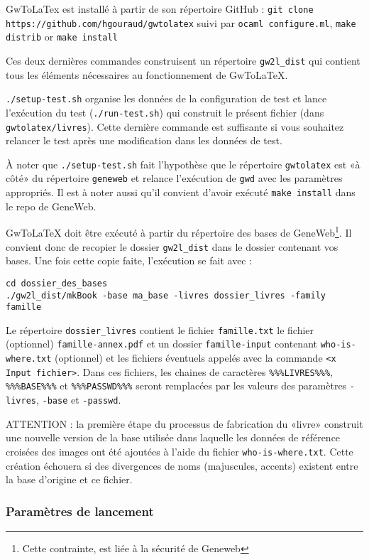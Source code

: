 GwToLaTex est installé à partir de son répertoire GitHub :
\verb|git clone https://github.com/hgouraud/gwtolatex|
suivi par
\verb|ocaml configure.ml|, \verb|make distrib| or \verb|make install|

Ces deux dernières commandes construisent un répertoire \verb|gw2l_dist| qui
contient tous les éléments nécessaires au fonctionnement de GwToLaTeX.

\verb|./setup-test.sh| organise les données de la configuration de test et
lance l'exécution du test (\verb|./run-test.sh|) qui construit le présent
fichier (dans \verb|gwtolatex/livres|). Cette dernière commande est
suffisante si vous souhaitez relancer le test après une modification
dans les données de test.

À noter que \verb|./setup-test.sh| fait l'hypothèse que le répertoire
\verb|gwtolatex| est «à côté» du répertoire \verb|geneweb| et relance
l'exécution de \verb|gwd| avec les paramètres appropriés. Il est à noter
aussi qu'il convient d'avoir exécuté \verb|make install| dans le repo de GeneWeb.

GwToLaTeX doit être exécuté à partir du répertoire des bases de
GeneWeb\footnote{Cette contrainte, est liée à la sécurité de Geneweb}.
Il convient donc de recopier le dossier \verb|gw2l_dist| dans le
dossier contenant vos bases. Une fois cette copie faite, l'exécution se
fait avec :
\begin{verbatim}
cd dossier_des_bases
./gw2l_dist/mkBook -base ma_base -livres dossier_livres -family famille
\end{verbatim}

Le répertoire \verb|dossier_livres| contient le fichier \verb|famille.txt|
le fichier (optionnel) \verb|famille-annex.pdf| et un dossier
\verb|famille-input| contenant \verb|who-is-where.txt| (optionnel)
et les fichiers éventuels appelés avec la commande \verb|<x Input fichier>|.
Dans ces fichiers, les chaines de caractères \verb|%%%LIVRES%%%|,
\verb|%%%BASE%%%| et \verb|%%%PASSWD%%%| seront remplacées par les valeurs
des paramètres \verb|-livres|, \verb|-base| et \verb|-passwd|.

ATTENTION : la première étape du processus de fabrication du «livre» construit une 
nouvelle version de la base utilisée dans laquelle les données de référence
croisées des images ont été ajoutées à l'aide du fichier \verb|who-is-where.txt|.
Cette création échouera si des divergences de noms (majuscules, accents) existent
entre la base d'origine et ce fichier.

\subsubsection{Paramètres de lancement}

